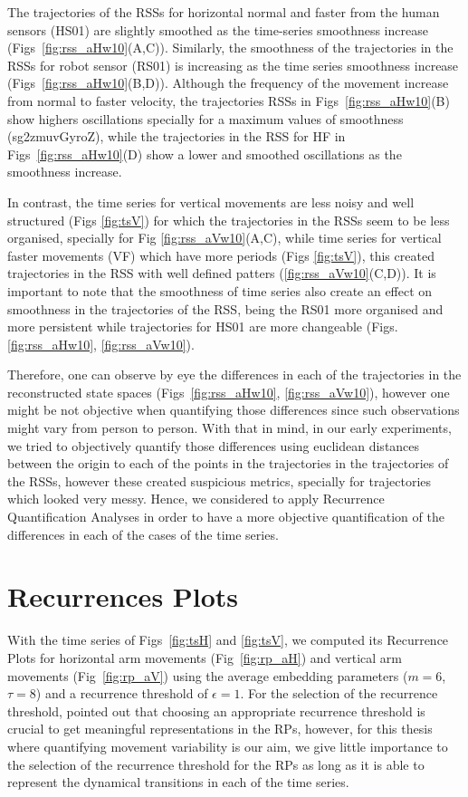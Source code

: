 The trajectories of the RSSs for horizontal normal and faster from the 
human sensors (HS01) are slightly smoothed as the time-series 
smoothness increase (Figs~\ref{fig:rss_aHw10}(A,C)). Similarly, 
the smoothness of the trajectories in the RSSs for robot sensor (RS01) 
is increasing as the time series smoothness increase 
(Figs~\ref{fig:rss_aHw10}(B,D)). 
Although the frequency of the movement increase from normal to faster velocity, 
the trajectories RSSs in Figs~\ref{fig:rss_aHw10}(B)
show highers oscillations specially for a maximum values of smoothness
(sg2zmuvGyroZ), while the trajectories in the RSS for HF in 
Figs~\ref{fig:rss_aHw10}(D) show a lower and smoothed oscillations 
as the smoothness increase.

In contrast, the time series for vertical movements are less noisy and 
well structured (Figs \ref{fig:tsV}) for which the trajectories in the RSSs 
seem to be less organised, specially for Fig \ref{fig:rss_aVw10}(A,C), 
while time series for vertical faster movements (VF) which have more 
periods (Figs \ref{fig:tsV}), this created trajectories in the RSS with 
well defined patters (\ref{fig:rss_aVw10}(C,D)).
It is important to note that the smoothness of time series also create 
an effect on smoothness in the trajectories of the RSS, being the RS01 
more organised and more persistent while trajectories for HS01 are 
more changeable (Figs. \ref{fig:rss_aHw10}, \ref{fig:rss_aVw10}).

Therefore, one can observe by eye the differences in each of the trajectories 
in the reconstructed state spaces 
(Figs~\ref{fig:rss_aHw10}, \ref{fig:rss_aVw10}), 
however one might be not objective when quantifying those differences 
since such observations might vary from person to person.
With that in mind, in our early experiments, we tried to objectively 
quantify those differences using euclidean distances between 
the origin to each of the points in the trajectories in the trajectories of 
the RSSs, however these created suspicious metrics, specially 
for trajectories which looked very messy.
Hence, we considered to apply Recurrence Quantification Analyses in order 
to have a more objective quantification of the differences in each of the 
cases of the time series.


\section{Recurrences Plots}
With the time series of Figs~\ref{fig:tsH} and \ref{fig:tsV}, 
we computed its Recurrence Plots for horizontal arm movements 
(Fig~\ref{fig:rp_aH}) and vertical arm movements (Fig~\ref{fig:rp_aV}) 
using the average embedding parameters ($m=6$, $\tau=8$) and a recurrence 
threshold of $\epsilon=1$. For the selection of the recurrence threshold,
\cite{marwan2011} pointed out that choosing an appropriate 
recurrence threshold is crucial to get meaningful representations in the RPs, 
however, for this thesis where quantifying movement variability is our aim,
we give little importance to the selection of the recurrence threshold 
for the RPs as long as it is able to represent the dynamical transitions 
in each of the time series.


